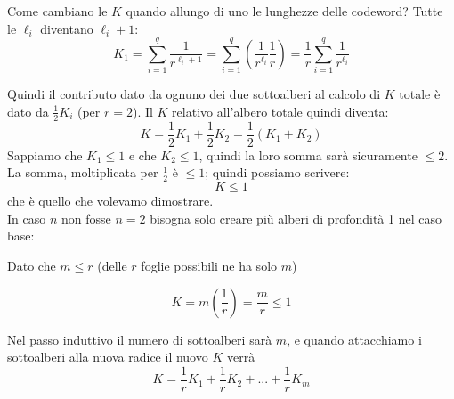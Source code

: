 \begin{dimostrazione}
Come cambiano le $K$ quando allungo di uno le lunghezze delle codeword? Tutte le $\ell_i$ diventano $\ell_i + 1$:
\begin{equation*}
K_1 = \sum_{i=1}^{q}\frac{1}{r^{\ell_i+1}} = \sum_{i=1}^{q}(\frac{1}{r^{\ell_i}}\frac{1}{r}) = \frac{1}{r}\sum_{i=1}^{q}\frac{1}{r^{\ell_i}}
\end{equation*}

Quindi il contributo dato da ognuno dei due sottoalberi al calcolo di $K$ totale è dato da $\frac{1}{2}K_i$ (per $r=2$).
Il $K$ relativo all'albero totale quindi diventa:
\begin{equation*}
K = \frac{1}{2}K_1 + \frac{1}{2}K_2 = \frac{1}{2}(K_1 + K_2)
\end{equation*}
Sappiamo che $K_1 \leq 1$ e che $K_2 \leq 1$, quindi la loro somma sarà sicuramente $\leq 2$. La somma, moltiplicata per $\frac{1}{2}$ è $\leq 1$; quindi possiamo scrivere:
\begin{equation*}
K \leq 1
\end{equation*}
che è quello che volevamo dimostrare.\\

In caso $n$ non fosse $n=2$ bisogna solo creare più alberi di profondità 1 nel caso base:

\begin{figure}[H]
	\centering
	\vspace{4mm}
\end{figure}

Dato che $m \leq r$ (delle $r$ foglie possibili ne ha solo $m$)

\begin{equation*}
K=m(\frac{1}{r}) = \frac{m}{r} \leq 1
\end{equation*}

Nel passo induttivo il numero di sottoalberi sarà $m$, e quando attacchiamo i sottoalberi alla nuova radice il nuovo $K$ verrà
\begin{equation*}
K=\frac{1}{r}K_1+\frac{1}{r}K_2+...+\frac{1}{r}K_m
\end{equation*}


\end{dimostrazione}
